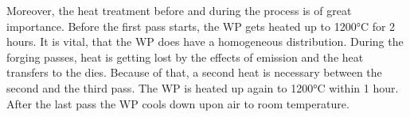 Moreover, the heat treatment before and during the process is of great importance. Before the first pass starts, the WP gets heated up to 1200°C for 2 hours. It is vital, that the WP does have a homogeneous distribution. During the forging passes, heat is getting lost by the effects of emission and the heat transfers to the dies. Because of that, a second heat is necessary between the second and the third pass. The WP is heated up again to 1200°C within 1 hour. After the last pass the WP cools down upon air to room temperature.
